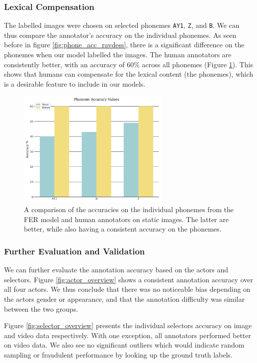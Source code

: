 \subsubsection{Lexical Compensation}
The labelled images were chosen on selected phonemes \texttt{AY1}, \texttt{Z}, and \texttt{B}. We can thus compare the annotator's accuracy on the individual phonemes. As seen before in figure \ref{fig:phone_acc_ravdess}, there is a significant difference on the phonemes when our model labelled the images. The human annotators are consistently better, with an accuracy of 60\% across all phonemes (Figure \ref{fig:phone_model_human}). This shows that humans can compensate for the lexical content (the phonemes), which is a desirable feature to include in our models.

\begin{figure}
    \centering
    \includegraphics[width=0.65\textwidth]{res/Phone_model_acc.png}
    \caption{A comparison of the accuracies on the individual phonemes from the FER model and human annotators on static images. The latter are better, while also having a consistent accuracy on the phonemes.}
    \label{fig:phone_model_human}
\end{figure}

\subsubsection{Further Evaluation and Validation}
We can further evaluate the annotation accuracy based on the actors and selectors. Figure \ref{fig:actor_overview} shows a consistent annotation accuracy over all four actors. We thus conclude that there was no noticeable bias depending on the actors gender or appearance, and that the annotation difficulty was similar between the two groups.

Figure \ref{fig:selector_overview} presents the individual selectors accuracy on image and video data respectively. With one exception, all annotators performed better on video data. We also see no significant outliers which would indicate random sampling or fraudulent performance by looking up the ground truth labels.

